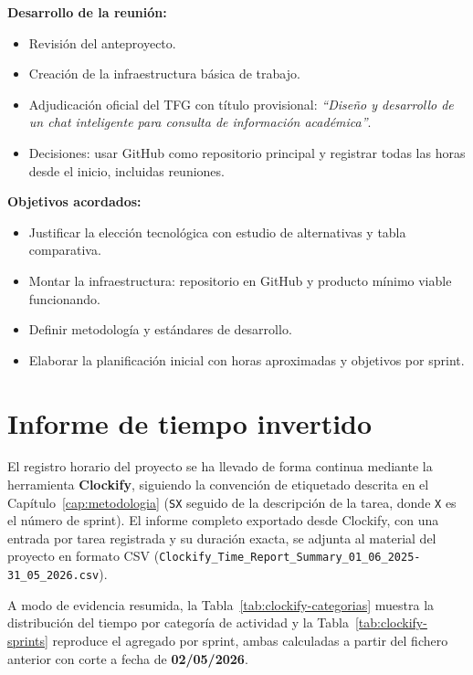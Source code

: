 \textbf{Desarrollo de la reunión:}
\begin{itemize}
  \item Revisión del anteproyecto.
  \item Creación de la infraestructura básica de trabajo.
  \item Adjudicación oficial del TFG con título provisional: \textit{``Diseño y desarrollo de un chat inteligente para consulta de información académica''}.
  \item Decisiones: usar GitHub como repositorio principal y registrar todas las horas desde el inicio, incluidas reuniones.
\end{itemize}

\textbf{Objetivos acordados:}
\begin{itemize}
  \item Justificar la elección tecnológica con estudio de alternativas y tabla comparativa.
  \item Montar la infraestructura: repositorio en GitHub y producto mínimo viable funcionando.
  \item Definir metodología y estándares de desarrollo.
  \item Elaborar la planificación inicial con horas aproximadas y objetivos por sprint.
\end{itemize}

\section{Informe de tiempo invertido}\label{ap:tiempo}

El registro horario del proyecto se ha llevado de forma continua mediante la herramienta \textbf{Clockify}, siguiendo la convención de etiquetado descrita en el Capítulo~\ref{cap:metodologia} (\texttt{SX} seguido de la descripción de la tarea, donde \texttt{X} es el número de sprint). El informe completo exportado desde Clockify, con una entrada por tarea registrada y su duración exacta, se adjunta al material del proyecto en formato CSV (\texttt{Clockify\_Time\_Report\_Summary\_01\_06\_2025-31\_05\_2026.csv}).

A modo de evidencia resumida, la Tabla~\ref{tab:clockify-categorias} muestra la distribución del tiempo por categoría de actividad y la Tabla~\ref{tab:clockify-sprints} reproduce el agregado por sprint, ambas calculadas a partir del fichero anterior con corte a fecha de \textbf{02/05/2026}.

